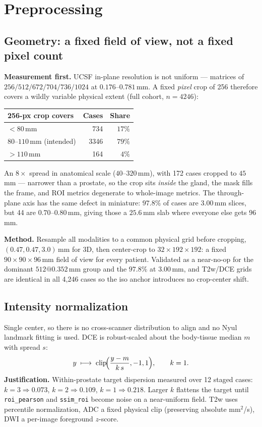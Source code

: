 \documentclass[11pt]{article}
\newcommand{\1}{\mathbb{1}}
\begin{document}
\section{Preprocessing}

\subsection{Geometry: a fixed field of view, not a fixed pixel count}

\textbf{Measurement first.} UCSF in-plane resolution is not uniform --- matrices of
$256/512/672/704/736/1024$ at $0.176$--$0.781$\,mm. A fixed \emph{pixel} crop of 256
therefore covers a wildly variable physical extent (full cohort, $n=4246$):

\begin{center}
\begin{tabular}{lrr}
\toprule
256-px crop covers & Cases & Share \\
\midrule
$<80$\,mm & 734 & $17\%$ \\
$80$--$110$\,mm (intended) & 3346 & $79\%$ \\
$>110$\,mm & 164 & $4\%$ \\
\bottomrule
\end{tabular}
\end{center}

An $8\times$ spread in anatomical scale ($40$--$320$\,mm), with 172 cases cropped to
$45$\,mm --- narrower than a prostate, so the crop sits \emph{inside} the gland, the mask
fills the frame, and ROI metrics degenerate to whole-image metrics. The through-plane axis
has the same defect in miniature: $97.8\%$ of cases are $3.00$\,mm slices, but 44 are
$0.70$--$0.80$\,mm, giving those a $25.6$\,mm slab where everyone else gets $96$\,mm.

\textbf{Method.} Resample all modalities to a common physical grid before cropping,
$(0.47,0.47,3.0)$\,mm for 3D, then center-crop to $32\times192\times192$: a fixed
$90\times90\times96$\,mm field of view for every patient. Validated as a near-no-op for the
dominant $512@0.352$\,mm group and the $97.8\%$ at $3.00$\,mm, and T2w/DCE grids are
identical in all 4{,}246 cases so the iso anchor introduces no crop-center shift.

\subsection{Intensity normalization}

Single center, so there is no cross-scanner distribution to align and no Nyul landmark
fitting is used. DCE is robust-scaled about the body-tissue median $m$ with spread $s$:
\begin{equation}
y\;\longmapsto\;\operatorname{clip}\!\Bigl(\frac{y-m}{k\,s},-1,1\Bigr),\qquad k=1 .
\end{equation}
\textbf{Justification.} Within-prostate target dispersion measured over 12 staged cases:
$k{=}3\Rightarrow0.073$, $k{=}2\Rightarrow0.109$, $k{=}1\Rightarrow\mathbf{0.218}$. Larger
$k$ flattens the target until \texttt{roi\_pearson} and \texttt{ssim\_roi} become noise on a
near-uniform field. T2w uses percentile normalization, ADC a fixed physical clip (preserving
absolute mm$^2$/s), DWI a per-image foreground $z$-score.
\end{document}
